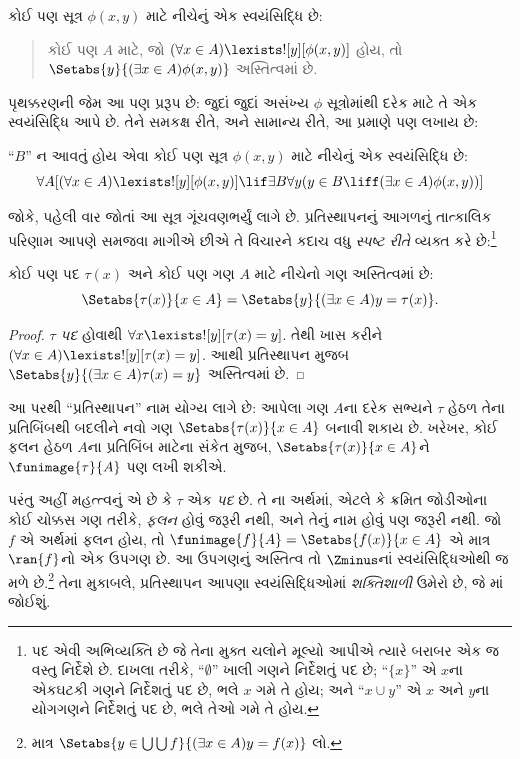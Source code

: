 \begin{axiom}[પ્રતિસ્થાપનનું પ્રરૂપ]
કોઈ પણ સૂત્ર $\phi(x, y)$ માટે નીચેનું એક સ્વયંસિદ્ધિ છે:
\begin{quote}
	કોઈ પણ $A$ માટે, જો $(\forall x \in A)\lexists![y][\phi(x,y)]$ હોય, તો
	$\Setabs{y}{(\exists x \in A)\phi(x,y)}$ અસ્તિત્વમાં છે.
\end{quote}
\end{axiom}
\noindent
પૃથક્કરણની જેમ આ પણ પ્રરૂપ છે: જુદાં જુદાં અસંખ્ય $\phi$ સૂત્રોમાંથી
દરેક માટે તે એક સ્વયંસિદ્ધિ આપે છે. તેને સમકક્ષ રીતે, અને સામાન્ય રીતે,
આ પ્રમાણે પણ લખાય છે:

\begin{defish}
``$B$'' ન આવતું હોય એવા કોઈ પણ સૂત્ર $\phi(x,y)$ માટે નીચેનું એક સ્વયંસિદ્ધિ છે:
\[
\forall A[(\forall x \in A)\lexists![y][\phi(x,y)] \lif \exists B\forall y (y \in B \liff (\exists x \in A)\phi(x,y))]
\]
\end{defish}

જોકે, પહેલી વાર જોતાં આ સૂત્ર ગૂંચવણભર્યું લાગે છે. પ્રતિસ્થાપનનું
આગળનું તાત્કાલિક પરિણામ આપણે સમજવા માગીએ છીએ તે વિચારને કદાચ વધુ
\emph{સ્પષ્ટ રીતે} વ્યક્ત કરે છે:\footnote{પદ એવી અભિવ્યક્તિ છે
જે તેના મુક્ત ચલોને મૂલ્યો આપીએ ત્યારે બરાબર એક જ વસ્તુ નિર્દેશે છે.
દાખલા તરીકે, ``$\emptyset$'' ખાલી ગણને નિર્દેશતું પદ છે;
``$\{x\}$'' એ $x$ના એકઘટકી ગણને નિર્દેશતું પદ છે, ભલે $x$ ગમે તે હોય;
અને ``$x \cup y$'' એ $x$ અને $y$ના યોગગણને નિર્દેશતું પદ છે,
ભલે તેઓ ગમે તે હોય.}

\begin{cor}
કોઈ પણ પદ $\tau(x)$ અને કોઈ પણ ગણ $A$ માટે નીચેનો ગણ અસ્તિત્વમાં છે:
\[
	\Setabs{\tau(x)}{x \in A} = \Setabs{y}{(\exists x \in A)y = \tau(x)}.
\]
\end{cor}

\begin{proof}
$\tau$ \emph{પદ} હોવાથી $\forall x \lexists![y][\tau(x) = y]$.
તેથી ખાસ કરીને $(\forall x \in A)\lexists![y][\tau(x) = y]$.
આથી પ્રતિસ્થાપન મુજબ
$\Setabs{y}{(\exists x \in A)\tau(x) = y}$ અસ્તિત્વમાં છે.
\end{proof}
\noindent
આ પરથી ``પ્રતિસ્થાપન'' નામ યોગ્ય લાગે છે: આપેલા ગણ $A$ના દરેક સભ્યને
$\tau$ હેઠળ તેના પ્રતિબિંબથી બદલીને નવો ગણ
$\Setabs{\tau(x)}{x \in A}$ બનાવી શકાય છે. ખરેખર, કોઈ ફલન
હેઠળ $A$ના પ્રતિબિંબ માટેના સંકેત મુજબ, $\Setabs{\tau(x)}{x \in A}$ને
$\funimage{\tau}{A}$ પણ લખી શકીએ.

પરંતુ અહીં મહત્ત્વનું એ છે કે $\tau$ એક \emph{પદ} છે. તે
ના અર્થમાં, એટલે કે ક્રમિત જોડીઓના
કોઈ ચોક્કસ ગણ તરીકે, \emph{ફલન} હોવું જરૂરી નથી, અને તેનું નામ
હોવું પણ જરૂરી નથી. જો $f$ એ અર્થમાં ફલન હોય, તો
$\funimage{f}{A} = \Setabs{f(x)}{x \in
A}$ એ માત્ર $\ran{f}$નો એક ઉપગણ છે. આ ઉપગણનું અસ્તિત્વ
તો $\Zminus$નાં સ્વયંસિદ્ધિઓથી જ મળે છે.\footnote{માત્ર
$\Setabs{y \in \bigcup \bigcup f}{(\exists x \in A)y =
f(x)}$ લો.} તેના મુકાબલે, પ્રતિસ્થાપન આપણા સ્વયંસિદ્ધિઓમાં
\emph{શક્તિશાળી} ઉમેરો છે, જે
માં જોઈશું.
\endgroup


